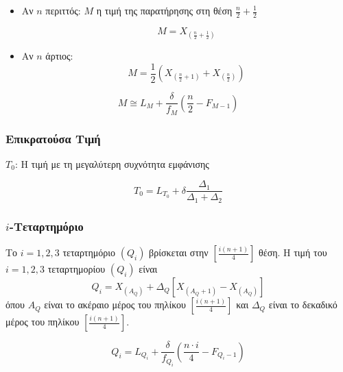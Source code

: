 \begin{multicols}{2}

    \begin{itemize}
      \item Αν $n$ περιττός: $M$ η τιμή της παρατήρησης στη θέση $\frac{n}{2}+\frac{1}{2}$

      \[M=X_{\left(\frac{n}{2}+\frac{1}{2}\right)}\]

      \item Αν $n$ άρτιος: \[M=\frac{1}{2}\left(X_{\left(\frac{n}{2}+1\right)}+X_{\left(\frac{n}{2}\right)}\right)\]
    \end{itemize}

\columnbreak

  \[M\cong L_{M}+\frac{\delta}{f_{M}}\left(\frac{n}{2}-F_{M-1}\right)\]

\end{multicols}

\subsubsection*{Επικρατούσα Τιμή}

\begin{multicols}{2}

  $T_{0}$: Η τιμή με τη μεγαλύτερη συχνότητα εμφάνισης

  \columnbreak

\[T_{0}=L_{T_{0}}+\delta \frac{\Delta_{1}}{\Delta_{1}+\Delta_{2}}\]

\end{multicols}

\subsubsection*{$i$-Τεταρτημόριο}

\begin{multicols}{2}

  Το $i=1,2,3$ τεταρτημόριο $(Q_{i})$ βρίσκεται στην $[\frac{i(n+1)}{4}]$ θέση. Η τιμή του $i=1,2,3$ τεταρτημορίου $(Q_{i})$ είναι \[Q_{i}=X_{(A_{Q})}+\Delta_{Q}[X_{(A_{Q}+1)}-X_{(A_{Q})}]\]όπου $A_{Q}$ είναι το ακέραιο μέρος του πηλίκου $[\frac{i(n+1)}{4}]$ και $\Delta_{Q}$ είναι το δεκαδικό μέρος του πηλίκου $[\frac{i(n+1)}{4}]$.

  \columnbreak

\[
Q_{i}=L_{Q_{i}}+\frac{\delta}{f_{Q_{i}}}\left(\frac{n\cdot i}{4}-F_{Q_{i}-1}\right)
\]

\end{multicols}

